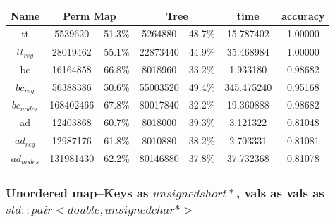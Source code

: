 \documentclass[]{article}
\theoremstyle{definition}
\begin{document}
\begin{center}
\begin{tabular} { |c|c|c|c|c|c|c| }
\hline
Name & \multicolumn{2}{c|}{Perm Map} & \multicolumn{2}{c|}{Tree} & time & accuracy \\
\hline

tt & 5539620 & 51.3\%  & 5264880 & 48.7\% & 15.787402 & 1.00000 \\

$tt_{reg}$ & 28019462 & 55.1\% & 22873440 & 44.9\% & 35.468984 & 1.00000 \\

bc & 16164858 & 66.8\% & 8018960 & 33.2\% & 1.933180 & 0.98682 \\

$bc_{reg}$ & 56388386 & 50.6\% & 55003520 & 49.4\% & 345.475240 & 0.95168 \\

$bc_{nodes}$ & 168402466 & 67.8\% & 80017840 & 32.2\% & 19.360888 & 0.98682 \\

ad & 12403868 & 60.7\% & 8018000 & 39.3\% & 3.121322 & 0.81048 \\

$ad_{reg}$ & 12987176 & 61.8\% & 8010880 & 38.2\% & 2.703331 & 0.81081 \\

$ad_{nodes}$ & 131981430 & 62.2\% & 80146880 & 37.8\% & 37.732368 & 0.81078 \\
\hline
\end{tabular}
\end{center}

\subsubsection{Unordered map--Keys as $unsigned short *$, vals as vals as $std::pair<double, unsigned char*>$}
\end{document}
